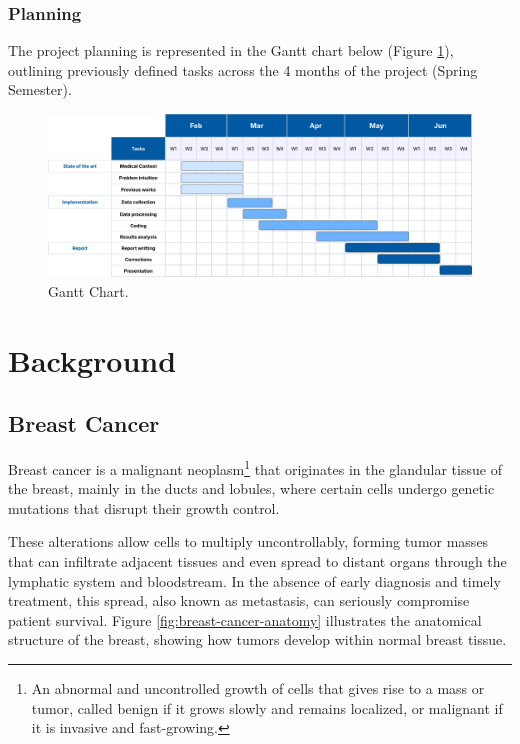 \documentclass[a4paper,10pt]{book}
\begin{document}
\subsection{Planning}

The project planning is represented in the Gantt chart below (Figure \ref{fig:roadmap}), outlining previously defined tasks across the 4 months of the project (Spring Semester).

\begin{figure}[h!]
	\centering
	\includegraphics[width=1\linewidth]{reports//assets/RoadmapV3.png}
	\caption[Planning Gantt Chart]{Gantt Chart.}
	\label{fig:roadmap}
\end{figure}


\chapter{Background}

\section{Breast Cancer}

Breast cancer is a malignant neoplasm\footnote{An abnormal and uncontrolled growth of cells that gives rise to a mass or tumor, called benign if it grows slowly and remains localized, or malignant if it is invasive and fast-growing.} that originates in the glandular tissue of the breast, mainly in the ducts and lobules, where certain cells undergo genetic mutations that disrupt their growth control. 

These alterations allow cells to multiply uncontrollably, forming tumor masses that can infiltrate adjacent tissues and even spread to distant organs through the lymphatic system and bloodstream. In the absence of early diagnosis and timely treatment, this spread, also known as metastasis, can seriously compromise patient survival. Figure \ref{fig:breast-cancer-anatomy} illustrates the anatomical structure of the breast, showing how tumors develop within normal breast tissue.
\end{document}
